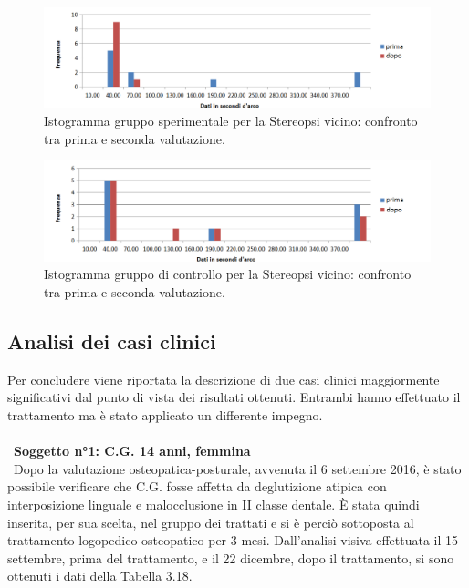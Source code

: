  \begin{figure}[h!]
	\centering
	\includegraphics[scale=0.38]{source/grafici/STEREOPSI_VICINO_TRATTATI.png}
	\caption[Istogramma gruppo sperimentale per la Stereopsi vicino]{Istogramma gruppo sperimentale per la Stereopsi vicino: confronto tra prima e seconda valutazione.}
	\label{fig:issuexample}
\end{figure}
 \begin{figure}[h!]
	\centering
	\includegraphics[scale=0.38]{source/grafici/STEREOPSI_VICINO_NON_TRATTATI.png}
	\caption[Istogramma gruppo di controllo per la Stereopsi vicino]{Istogramma gruppo di controllo per la Stereopsi vicino: confronto tra prima e seconda valutazione.}
	\label{fig:issuexample}
\end{figure}

\subsection{Analisi dei casi clinici}

Per concludere viene riportata la descrizione di due casi clinici maggiormente significativi dal punto di vista dei risultati ottenuti. Entrambi hanno effettuato il trattamento ma è stato applicato un differente impegno.
\\\ \\\
\textbf{Soggetto n°1: C.G. 14 anni, femmina}
\\\
Dopo la valutazione osteopatica-posturale, avvenuta il 6 settembre 2016, è stato possibile verificare che C.G. fosse affetta da deglutizione atipica con interposizione linguale e malocclusione in II classe dentale. È stata quindi inserita, per sua scelta, nel gruppo dei trattati e si è perciò sottoposta al trattamento logopedico-osteopatico per 3 mesi. Dall’analisi visiva effettuata il 15 settembre, prima del trattamento, e il 22 dicembre, dopo il trattamento, si sono ottenuti i dati della Tabella 3.18.

